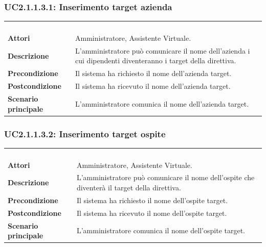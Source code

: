 \subsubsection{UC2.1.1.3.1: Inserimento target azienda}
\label{UC2.1.1.3.1}
\begin{longtable}{l|p{10cm}}
	\rowcolor[gray]{0.8} \multicolumn{2}{c}{} \\
	\rowcolor[gray]{0.8} \multicolumn{2}{c}{\textbf{UC2.1.1.3.1 - Inserimento target azienda}} \\
	\rowcolor[gray]{0.8} \multicolumn{2}{c}{} \\
	\hline
	&\\
	\textbf{Attori} & Amministratore, Assistente Virtuale.\\[7pt]
	\textbf{Descrizione} & L'amministratore può comunicare il nome dell'azienda i cui dipendenti diventeranno i target della direttiva.\\[7pt]
	\textbf{Precondizione} & Il sistema ha richiesto il nome dell'azienda target.\\[7pt]
	\textbf{Postcondizione} & Il sistema ha ricevuto il nome dell'azienda target.\\[7pt]
	\textbf{Scenario principale} &L'amministratore comunica il nome dell'azienda target.\\[7pt]\hline
\end{longtable}

\subsubsection{UC2.1.1.3.2: Inserimento target ospite}
\label{UC2.1.1.3.2}
\begin{longtable}{l|p{10cm}}
	\rowcolor[gray]{0.8} \multicolumn{2}{c}{} \\
	\rowcolor[gray]{0.8} \multicolumn{2}{c}{\textbf{UC2.1.1.3.2 - Inserimento target ospite}} \\
	\rowcolor[gray]{0.8} \multicolumn{2}{c}{} \\
	\hline
	&\\
	\textbf{Attori} & Amministratore, Assistente Virtuale.\\[7pt]
	\textbf{Descrizione} & L'amministratore può comunicare il nome dell'ospite che diventerà il target della direttiva.\\[7pt]
	\textbf{Precondizione} & Il sistema ha richiesto il nome dell'ospite target.\\[7pt]
	\textbf{Postcondizione} & Il sistema ha ricevuto il nome dell'ospite target.\\[7pt]
	\textbf{Scenario principale} &L'amministratore comunica il nome dell'ospite target.\\[7pt]\hline
\end{longtable}

